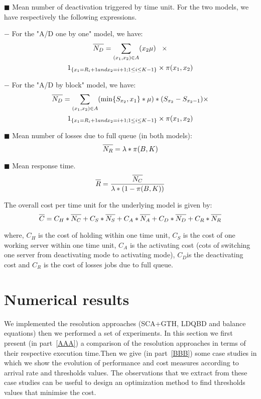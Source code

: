 \documentclass[conference]{IEEEtran}
\begin{document}
$\blacksquare$ Mean number of deactivation triggered by time unit. For the two models, we have respectively the following expressions.

$-$ For the  "A/D one by one" model, we have:
\begin{multline}
\overline{\mathstrut N_{D}}=\sum_{(x_{1},x_{2}) \in A}(x_{2}\mu)\;\;\;\times\\
1_{\{x_{1}=R_{i}+1 \mbox{ and } x_{2}=i+1 \mbox{ ; } 1 \leq i \leq K-1\}}\times\pi(x_{1},x_{2})
\end{multline}

$-$ For the  "A/D by block" model, we have:
\begin{multline}
\overline{\mathstrut N_{D}}=\sum_{(x_{1},x_{2}) \in A}(\min\{S_{x_{2}},x_{1}\}*\mu)*(S_{x_2}-S_{x_2-1})\times \\
1_{\{x_{1}=R_{i}+1 \mbox{ and } x_{2}=i+1 \mbox{ ; } 1 \leq i \leq K-1\}}
\times\pi(x_{1},x_{2})
\end{multline}

$\blacksquare$ Mean number of losses  due to full queue (in both models):
\begin{equation}
    \overline{\mathstrut N_{R}}=\lambda*\pi(B,K)
\end{equation}

$\blacksquare$ Mean response time.
\begin{equation}
    \label{formule:tempsreponse}
    \overline{\mathstrut R}=\frac{\overline{\mathstrut N_{C}}}{\lambda*(1-\pi(B,K))}
\end{equation}

The overall cost per  time unit for the underlying model is given by:
\begin{equation}
    \label{formule:cost}
    \overline{\mathstrut C}=C_{H}*\overline{\mathstrut N_{C}}+C_{S}*\overline{\mathstrut N_{S}}+C_{A}*\overline{\mathstrut N_{A}}+C_{D}*\overline{\mathstrut N_{D}}+C_{R}*\overline{\mathstrut N_{R}}
\end{equation}

where, $C_{H}$ is the cost of holding within one time unit,
$C_{S}$ is the  cost of one working server within one time unit,
 $C_{A}$ is the activating cost (cots of switching one server from deactivating mode to activating mode),
 $C_{D}$is the deactivating cost  and   $C_{R}$ is the cost of losses jobs due to full queue.

\section{Numerical results}\label{sec:ResNum}
We implemented the resolution approaches (SCA+GTH, LDQBD and balance equations) then we performed a set of experiments. In this section we first 
present (in part~\ref{AAA}) a comparison of the resolution approaches in terms of their respective execution time.Then we give (in part~\ref{BBB}) some case studies in which we show the evolution of performance and cost measures according to arrival rate and thresholds values. The observations that we extract from these case studies can be useful to design an optimization method to find thresholds values that minimise the cost.
\end{document}
